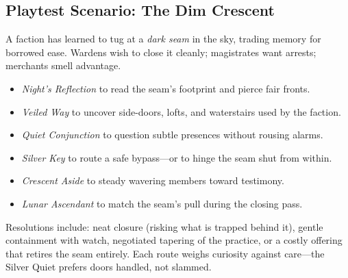 \subsection*{Playtest Scenario: The Dim Crescent}
A faction has learned to tug at a \emph{dark seam} in the sky, trading memory for borrowed ease. Wardens wish to close it cleanly; magistrates want arrests; merchants smell advantage.

\begin{itemize}
  \item \emph{Night’s Reflection} to read the seam’s footprint and pierce fair fronts.
  \item \emph{Veiled Way} to uncover side-doors, lofts, and waterstairs used by the faction.
  \item \emph{Quiet Conjunction} to question subtle presences without rousing alarms.
  \item \emph{Silver Key} to route a safe bypass—or to hinge the seam shut from within.
  \item \emph{Crescent Aside} to steady wavering members toward testimony.
  \item \emph{Lunar Ascendant} to match the seam’s pull during the closing pass.
\end{itemize}

\noindent Resolutions include: neat closure (risking what is trapped behind it), gentle containment with watch, negotiated tapering of the practice, or a costly offering that retires the seam entirely. Each route weighs curiosity against care—the Silver Quiet prefers doors handled, not slammed.
